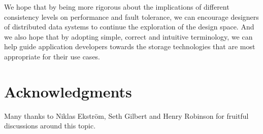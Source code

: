 \documentclass[fleqn,12pt,lineno]{wlpeerj} %
\begin{document}
We hope that by being more rigorous about the implications of different consistency levels on
performance and fault tolerance, we can encourage designers of distributed data systems to continue
the exploration of the design space. And we also hope that by adopting simple, correct and intuitive
terminology, we can help guide application developers towards the storage technologies that are most
appropriate for their use cases.

\section*{Acknowledgments}

Many thanks to Niklas Ekström, Seth Gilbert and Henry Robinson for fruitful discussions around this topic.


\end{document}
